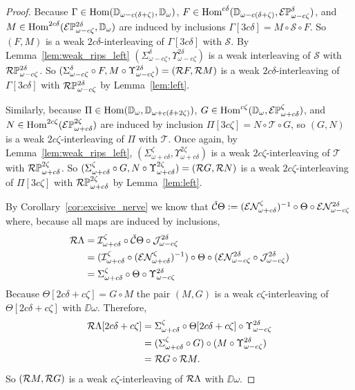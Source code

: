 \begin{proof}
  Because $\Gamma\in\mathrm{Hom}(\mathbb{D}_{\omega-c(\delta+\zeta)},\mathbb{D}_{\omega})$, $F\in\mathrm{Hom}^{c\delta}(\mathbb{D}_{\omega-c(\delta+\zeta)}, \mathcal{E} \mathbb{P}_{\omega-c\zeta}^{\delta})$, and $M\in\mathrm{Hom}^{2c\delta}(\mathcal{E} \mathbb{P}_{\omega-c\zeta}^{2\delta}, \mathbb{D}_{\omega})$ are induced by inclusions $\Gamma[3c\delta] = M\circ\mathcal{S}\circ F$.
  So $(F, M)$ is a weak $2c\delta$-interleaving of $\Gamma[3c\delta]$ with $\mathcal{S}$.
  By Lemma~\ref{lem:weak_rips_left} $(\Sigma_{\omega-c\zeta}^{\delta},\Upsilon_{\omega-c\zeta}^{2\delta})$ is a weak interleaving of $\mathcal{S}$ with $\mathcal{R}\mathbb{P}_{\omega-c\zeta}^{2\delta}$.
  So $(\Sigma_{\omega-c\zeta}^{\delta}\circ F, M\circ \Upsilon_{\omega-c\zeta}^{2\delta}) = (\mathcal{R} F, \mathcal{R} M)$ is a weak $2c\delta$-interleaving of $\Gamma[3c\delta]$ with $\mathcal{R}\mathbb{P}_{\omega-c\zeta}^{2\delta}$ by Lemma~\ref{lem:left}.

  Similarly, because $\Pi\in\mathrm{Hom}(\mathbb{D}_{\omega},\mathbb{D}_{\omega+c(\delta+2\zeta)})$, $G\in\mathrm{Hom}^{c\zeta}(\mathbb{D}_{\omega}, \mathcal{E} \mathbb{P}_{\omega+c\delta}^{\zeta})$, and $N\in\mathrm{Hom}^{2c\zeta}(\mathcal{E} \mathbb{P}_{\omega+c\delta}^{2\zeta})$ are induced by inclusion $\Pi[3c\zeta] = N\circ \mathcal{T}\circ G$, so $(G, N)$ is a weak $2c\zeta$-interleaving of $\Pi$ with $\mathcal{T}$.
  Once again, by Lemma~\ref{lem:weak_rips_left}, $(\Sigma_{\omega+c\delta}^{\zeta},\Upsilon_{\omega+c\delta}^{2\zeta})$ is a weak $2c\zeta$-interleaving of $\mathcal{T}$ with $\mathcal{R}\mathbb{P}_{\omega+c\delta}^{2\zeta}$.
  So $(\Sigma_{\omega+c\delta}^{\zeta}\circ G, N\circ \Upsilon_{\omega+c\delta}^{2\zeta}) = (\mathcal{R} G, \mathcal{R} N)$ is a weak $2c\zeta$-interleaving of $\Pi[3c\zeta]$ with $\mathcal{R}\mathbb{P}_{\omega+c\delta}^{2\zeta}$ by Lemma~\ref{lem:left}.

  By Corollary~\ref{cor:excisive_nerve} we know that $\check{\mathcal{C}}\Theta := (\mathcal{E}\mathcal{N}_{\omega+c\delta}^\zeta)^{-1}\circ \Theta\circ \mathcal{E}\mathcal{N}_{\omega-c\zeta}^{2\delta}$
  where, because all maps are induced by inclusions,
  \begin{align*}
    \mathcal{R}\Lambda &= \mathcal{I}_{\omega+c\delta}^\zeta\circ\check{\mathcal{C}}\Theta\circ\mathcal{J}_{\omega-c\zeta}^{2\delta}\\
      &= (\mathcal{I}_{\omega+c\delta}^\zeta\circ (\mathcal{E}\mathcal{N}_{\omega+c\delta}^\zeta)^{-1})\circ \Theta\circ (\mathcal{E}\mathcal{N}_{\omega-c\zeta}^{2\delta}\circ \mathcal{J}_{\omega-c\zeta}^{2\delta})\\
      &= \Sigma_{\omega+c\delta}^\zeta\circ \Theta\circ \Upsilon_{\omega-c\zeta}^{2\delta}\\
  \end{align*}
  Because $\Theta[2c\delta+c\zeta] = G\circ M$ the pair $(M, G)$ is a weak $c\zeta$-interleaving of $\Theta[2c\delta+c\zeta]$ with $\DD{\omega}$.
  Therefore,
  \begin{align*}
    \mathcal{R}\Lambda[2c\delta+c\zeta] &= \Sigma_{\omega+c\delta}^\zeta\circ \Theta[2c\delta+c\zeta]\circ \Upsilon_{\omega-c\zeta}^{2\delta}\\
      &= (\Sigma_{\omega+c\delta}^\zeta\circ G)\circ (M\circ \Upsilon_{\omega-c\zeta}^{2\delta})\\
      &= \mathcal{R} G\circ \mathcal{R} M.
  \end{align*}
  So $(\mathcal{R} M, \mathcal{R} G)$ is a weak $c\zeta$-interleaving of $\mathcal{R}\Lambda$ with $\DD{\omega}$.


\end{proof}

